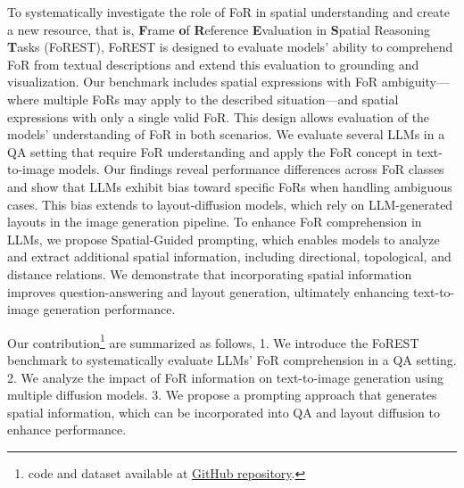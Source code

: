 
To systematically investigate the role of FoR in spatial understanding and create a new resource, that is, \textbf{F}rame \textbf{o}f \textbf{R}eference \textbf{E}valuation in \textbf{S}patial Reasoning \textbf{T}asks (FoREST),
FoREST is designed to evaluate models’ ability to comprehend FoR from textual descriptions and extend this evaluation to grounding and visualization.
Our benchmark includes spatial expressions with FoR ambiguity—where multiple FoRs may apply to the described situation—and spatial expressions with only a single valid FoR.
This design allows evaluation of the models' understanding of FoR in both scenarios.
We evaluate several LLMs in a QA setting that require FoR understanding and apply the FoR concept in text-to-image models.
Our findings reveal performance differences across FoR classes and show that LLMs exhibit bias toward specific FoRs when handling ambiguous cases.
This bias extends to layout-diffusion models, which rely on LLM-generated layouts in the image generation pipeline.
To enhance FoR comprehension in LLMs, we propose Spatial-Guided prompting, which enables models to analyze and extract additional spatial information, including directional, topological, and distance relations. 
We demonstrate that incorporating spatial information improves question-answering and layout generation, ultimately enhancing text-to-image generation performance.

Our contribution\footnote{code and dataset available at \href{https://github.com/HLR/FoREST.git}{GitHub repository}. } are summarized as follows, 
1. We introduce the FoREST benchmark to systematically evaluate LLMs’ FoR comprehension in a QA setting.
2. We analyze the impact of FoR information on text-to-image generation using multiple diffusion models.
3. We propose a prompting approach that generates spatial information, which can be incorporated into QA and layout diffusion to enhance performance.